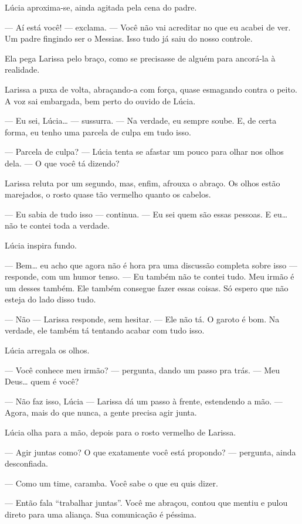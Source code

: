 Lúcia aproxima-se, ainda agitada pela cena do padre.

— Aí está você! — exclama. — Você não vai acreditar no que eu acabei de ver. Um padre fingindo ser o Messias. Isso tudo já saiu do nosso controle.

Ela pega Larissa pelo braço, como se precisasse de alguém para ancorá-la à realidade.

Larissa a puxa de volta, abraçando-a com força, quase esmagando contra o peito.  
A voz sai embargada, bem perto do ouvido de Lúcia.

— Eu sei, Lúcia… — sussurra. — Na verdade, eu sempre soube.  
E, de certa forma, eu tenho uma parcela de culpa em tudo isso.

— Parcela de culpa? — Lúcia tenta se afastar um pouco para olhar nos olhos dela. — O que você tá dizendo?

Larissa reluta por um segundo, mas, enfim, afrouxa o abraço.  
Os olhos estão marejados, o rosto quase tão vermelho quanto os cabelos.

— Eu sabia de tudo isso — continua. — Eu sei quem são essas pessoas.  
E eu… não te contei toda a verdade.

Lúcia inspira fundo.

— Bem… eu acho que agora não é hora pra uma discussão completa sobre isso — responde, com um humor tenso. — Eu também não te contei tudo.  
Meu irmão é um desses também.  
Ele também consegue fazer essas coisas.  
Só espero que não esteja do lado disso tudo.

— Não — Larissa responde, sem hesitar. — Ele não tá. O garoto é bom.  
Na verdade, ele também tá tentando acabar com tudo isso.

Lúcia arregala os olhos.

— Você conhece meu irmão? — pergunta, dando um passo pra trás. — Meu Deus… quem é você?

— Não faz isso, Lúcia — Larissa dá um passo à frente, estendendo a mão. — Agora, mais do que nunca, a gente precisa agir junta.

Lúcia olha para a mão, depois para o rosto vermelho de Larissa.

— Agir juntas como? O que exatamente você está propondo? — pergunta, ainda desconfiada.

— Como um time, caramba. Você sabe o que eu quis dizer.

— Então fala “trabalhar juntas”. Você me abraçou, contou que mentiu e pulou direto para uma aliança. Sua comunicação é péssima.

